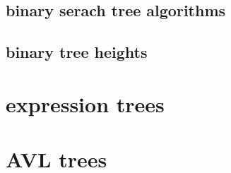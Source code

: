 \subsection{binary serach tree algorithms}    
 

\subsection{binary tree heights}


\section{expression trees}


\section{AVL trees}




